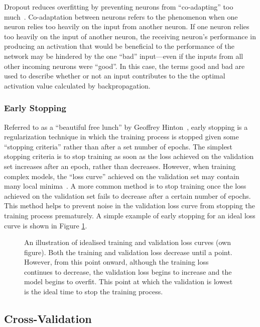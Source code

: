 Dropout reduces overfitting by preventing neurons from ``co-adapting'' too much~\cite{dropout}. Co-adaptation between neurons refers to the phenomenon when one neuron relies too heavily on the input from another neuron. If one neuron relies too heavily on the input of another neuron, the receiving neuron's performance in producing an activation that would be beneficial to the performance of the network may be hindered by the one ``bad'' input---even if the inputs from all other incoming neurons were ``good''. In this case, the terms good and bad are used to describe whether or not an input contributes to the the optimal activation value calculated by backpropagation.

\subsubsection{Early Stopping}

Referred to as a ``beautiful free lunch'' by Geoffrey Hinton~\cite[p. 141]{earlystoppinglunch}, early stopping is a regularization technique in which the training process is stopped given some ``stopping criteria'' rather than after a set number of epochs. The simplest stopping criteria is to stop training as soon as the loss achieved on the validation set increases after an epoch, rather than decreases. However, when training complex models, the ``loss curve'' achieved on the validation set may contain many local minima~\cite{earlystopping}. A more common method is to stop training once the loss achieved on the validation set fails to decrease after a certain number of epochs. This method helps to prevent noise in the validation loss curve from stopping the training process prematurely. A simple example of early stopping for an ideal loss curve is shown in Figure \ref{fig:earlystop}.

\begin{figure}[t]
    \centering
    
    \caption{An illustration of idealised training and validation loss curves (own figure). Both the training and validation loss decrease until a point. However, from this point onward, although the training loss continues to decrease, the validation loss begins to increase and the model begins to overfit. This point at which the validation is lowest is the ideal time to stop the training process.}
    \label{fig:earlystop}
\end{figure}

\subsection{Cross-Validation}

